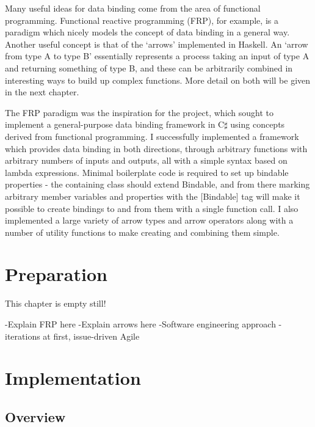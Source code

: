 \documentclass[12pt,twoside,notitlepage]{report}
\begin{document}
Many useful ideas for data binding come from the area of functional programming. Functional reactive programming (FRP), for example, is a paradigm which nicely models the concept of data binding in a general way. Another useful concept is that of the `arrows' implemented in Haskell. An `arrow from type A to type B' essentially represents a process taking an input of type A and returning something of type B, and these can be arbitrarily combined in interesting ways to build up complex functions. More detail on both will be given in the next chapter.

The FRP paradigm was the inspiration for the project, which sought to implement a general-purpose data binding framework in C$\sharp$ using concepts derived from functional programming. I successfully implemented a framework which provides data binding in both directions, through arbitrary functions with arbitrary numbers of inputs and outputs, all with a simple syntax based on lambda expressions. Minimal boilerplate code is required to set up bindable properties - the containing class should extend Bindable, and from there marking arbitrary member variables and properties with the [Bindable] tag will make it possible to create bindings to and from them with a single function call. I also implemented a large variety of arrow types and arrow operators along with a number of utility functions to make creating and combining them simple.

\cleardoublepage



\chapter{Preparation}

This chapter is empty still!

-Explain FRP here
-Explain arrows here
-Software engineering approach - iterations at first, issue-driven Agile

\cleardoublepage



\chapter{Implementation}

\section{Overview}
\end{document}
